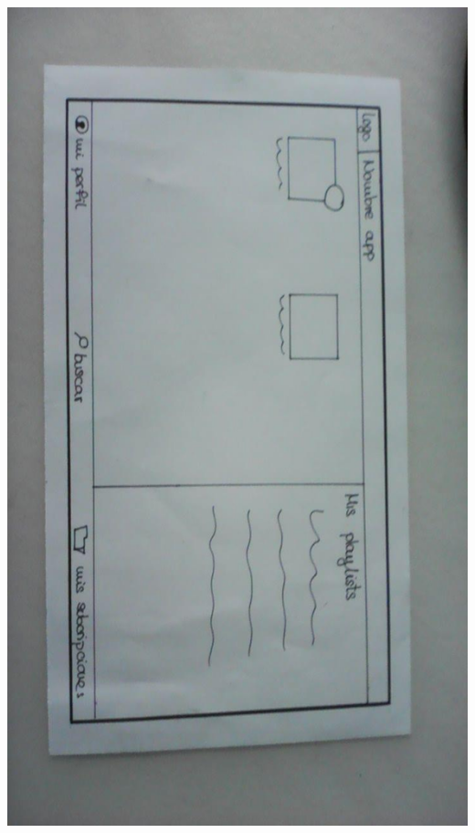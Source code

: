 \documentclass[a4paper]{article}
\begin{document}
\begin{center}
\includegraphics[width=0.7\columnwidth]{Boceto-6.jpg}
\end{center}
\end{document}
